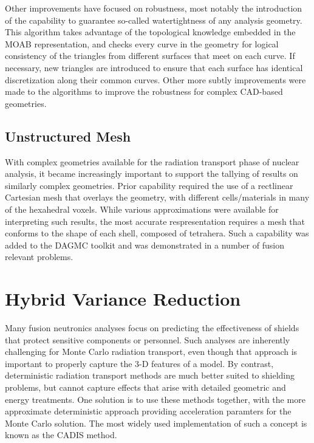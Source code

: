 Other improvements have focused on robustness, most notably the introduction
of the capability to guarantee so-called watertightness of any analysis
geometry.  This algorithm takes advantage of the topological knowledge
embedded in the \gls{MOAB} representation, and checks every curve in the
geometry for logical consistency of the triangles from different surfaces that
meet on each curve.  If necessary, new triangles are introduced to ensure that
each surface has identical discretization along their common
curves. Other more subtly improvements were made to the
algorithms to improve the robustness for complex \gls{CAD}-based
geometries.

\subsection{Unstructured Mesh}\label{sec:umesh}

With complex geometries available for the radiation transport phase of nuclear
analysis, it became increasingly important to support the tallying of results
on similarly complex geometries.  Prior capability required the use of a
rectlinear Cartesian mesh that overlays the geometry, with different
cells/materials in many of the hexahedral voxels.  While various
approximations were available for interpreting such results, the most accurate
respresentation requires a mesh that conforms to the shape of each shell,
composed of tetrahera.  Such a capability was added to the \gls{DAGMC} toolkit
and was demonstrated in a number of fusion relevant
problems.

\section{Hybrid Variance Reduction}\label{sec:hybrid}

Many fusion neutronics analyses focus on predicting the effectiveness of
shields that protect sensitive components or personnel.  Such analyses are
inherently challenging for Monte Carlo radiation transport, even though that
approach is important to properly capture the 3-D features of a model.  By
contrast, deterministic radiation transport methods are much better suited to
shielding problems, but cannot capture effects that arise with detailed
geometric and energy treatments.  One solution is to use these methods
together, with the more approximate deterministic approach providing
acceleration paramters for the Monte Carlo solution.  The most widely used
implementation of such a concept is known as the \gls{CADIS}
method.

